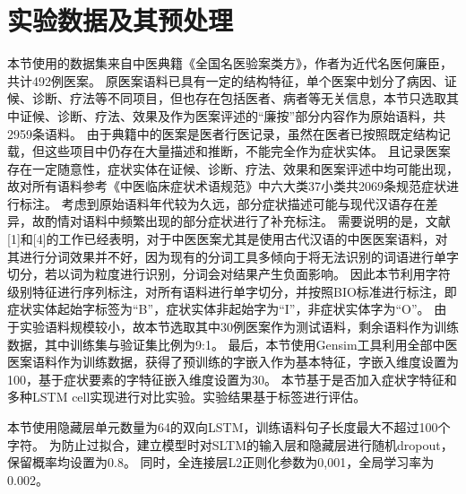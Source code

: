 \section{实验数据及其预处理}
本节使用的数据集来自中医典籍《全国名医验案类方》，作者为近代名医何廉臣，共计492例医案。
原医案语料已具有一定的结构特征，单个医案中划分了病因、证候、诊断、疗法等不同项目，但也存在包括医者、病者等无关信息，本节只选取其中证候、诊断、疗法、效果及作为医案评述的“廉按”部分内容作为原始语料，共2959条语料。
由于典籍中的医案是医者行医记录，虽然在医者已按照既定结构记载，但这些项目中仍存在大量描述和推断，不能完全作为症状实体。
且记录医案存在一定随意性，症状实体在证候、诊断、疗法、效果和医案评述中均可能出现，故对所有语料参考《中医临床症状术语规范》中六大类37小类共2069条规范症状进行标注。
考虑到原始语料年代较为久远，部分症状描述可能与现代汉语存在差异，故酌情对语料中频繁出现的部分症状进行了补充标注。
需要说明的是，文献[1]和[4]的工作已经表明，对于中医医案尤其是使用古代汉语的中医医案语料，对其进行分词效果并不好，因为现有的分词工具多倾向于将无法识别的词语进行单字切分，若以词为粒度进行识别，分词会对结果产生负面影响。
因此本节利用字符级别特征进行序列标注，对所有语料进行单字切分，并按照BIO标准进行标注，即症状实体起始字标签为“B”，症状实体非起始字为“I”，非症状实体字为“O”。
由于实验语料规模较小，故本节选取其中30例医案作为测试语料，剩余语料作为训练数据，其中训练集与验证集比例为9:1。
最后，本节使用Gensim工具利用全部中医医案语料作为训练数据，获得了预训练的字嵌入作为基本特征，字嵌入维度设置为100，基于症状要素的字特征嵌入维度设置为30。
本节基于是否加入症状字特征和多种LSTM cell实现进行对比实验。实验结果基于标签进行评估。

本节使用隐藏层单元数量为64的双向LSTM，训练语料句子长度最大不超过100个字符。
为防止过拟合，建立模型时对SLTM的输入层和隐藏层进行随机dropout，保留概率均设置为0.8。
同时，全连接层L2正则化参数为0,001，全局学习率为0.002。


